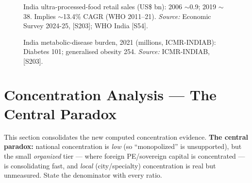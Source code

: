 \documentclass[11pt,a4paper]{article}
\newcommand{\cs}[1]{\textnormal{[#1]}}
\begin{document}
\begin{figure}[htbp]
\centering
{}
\caption{India ultra-processed-food retail sales (US\$ bn): 2006 $\sim$0.9; 2019 $\sim$38. Implies $\sim$13.4\% CAGR (WHO 2011--21). \textit{Source:} Economic Survey 2024-25, \cs{S203}; WHO India \cs{S54}.}
\label{fig:ch7upf}
\end{figure}

\begin{figure}[htbp]
\centering
{}
\caption{India metabolic-disease burden, 2021 (millions, ICMR-INDIAB): Diabetes 101; generalised obesity 254. \textit{Source:} ICMR-INDIAB, \cs{S203}.}
\label{fig:ch8metabolic}
\end{figure}

\section{Concentration Analysis --- The Central Paradox}\label{sec:concentration}
This section consolidates the new computed concentration evidence. \textbf{The central paradox:} national concentration is \emph{low} (so ``monopolized'' is unsupported), but the small \emph{organized} tier --- where foreign PE/sovereign capital is concentrated --- is consolidating fast, and \emph{local} (city/specialty) concentration is real but unmeasured. State the denominator with every ratio.
\end{document}
